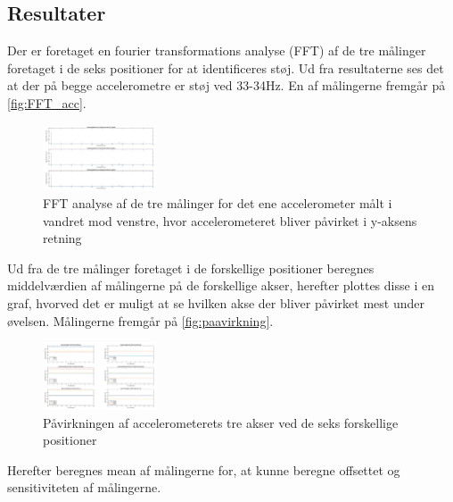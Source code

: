 \subsection{Resultater}
Der er foretaget en fourier transformations analyse (FFT) af de tre målinger foretaget i de seks positioner for at identificeres støj. Ud fra resultaterne ses det at der på begge accelerometre er støj ved 33-34Hz. En af målingerne fremgår på \autoref{fig:FFT_acc}. 

\begin{figure}[H]
\centering
\includegraphics[width=0.3\textwidth]{figures/FFT_acc}
\caption{FFT analyse af de tre målinger for det ene accelerometer målt i vandret mod venstre, hvor accelerometeret bliver påvirket i y-aksens retning}
\label{fig:FFT_acc}
\end{figure}

Ud fra de tre målinger foretaget i de forskellige positioner beregnes middelværdien af målingerne på de forskellige akser, herefter plottes disse i en graf, hvorved det er muligt at se hvilken akse der bliver påvirket mest under øvelsen. Målingerne fremgår på \autoref{fig:paavirkning}. 

\begin{figure}[H]
\centering
\includegraphics[width=0.3\textwidth]{figures/paavirkning}
\caption{Påvirkningen af accelerometerets tre akser ved de seks forskellige positioner}
\label{fig:paavirkning}
\end{figure}

Herefter beregnes mean af målingerne for, at kunne beregne offsettet og sensitiviteten af målingerne.




